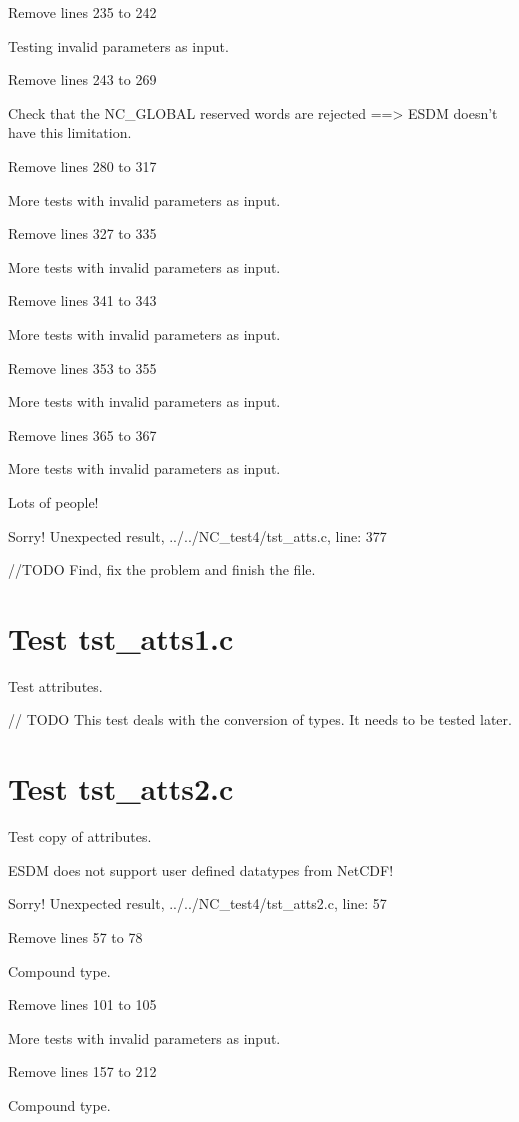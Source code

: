 Remove lines 235 to 242

Testing invalid parameters as input.

Remove lines 243 to 269

Check that the NC\_GLOBAL reserved words are rejected ==> ESDM doesn't have this limitation.

Remove lines 280 to 317

More tests with invalid parameters as input.

Remove lines 327 to 335

More tests with invalid parameters as input.

Remove lines 341 to 343

More tests with invalid parameters as input.

Remove lines 353 to 355

More tests with invalid parameters as input.

Remove lines 365 to 367

More tests with invalid parameters as input.

Lots of people!

Sorry! Unexpected result, ../../NC\_test4/tst\_atts.c, line: 377

//TODO Find, fix the problem and finish the file.

\section{Test tst\_atts1.c}

Test attributes.

// TODO This test deals with the conversion of types. It needs to be tested later.

\section{Test tst\_atts2.c}

Test copy of attributes.

ESDM does not support user defined datatypes from NetCDF!

Sorry! Unexpected result, ../../NC\_test4/tst\_atts2.c, line: 57

Remove lines 57 to 78

Compound type.

Remove lines 101 to 105

More tests with invalid parameters as input.

Remove lines 157 to 212

Compound type.


